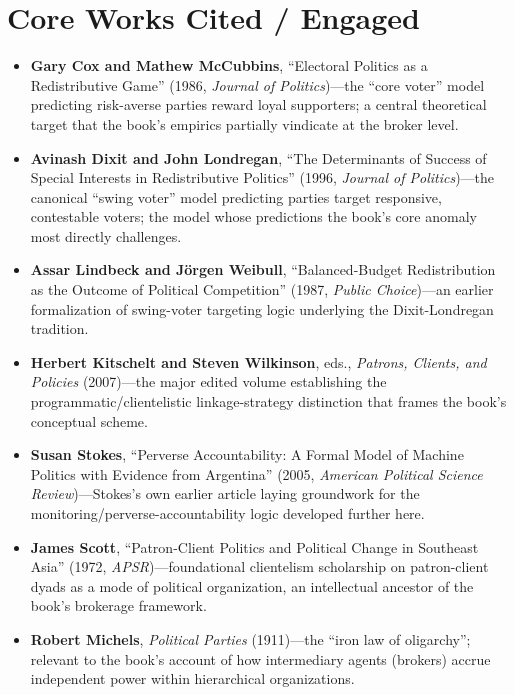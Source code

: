 \documentclass[12pt]{article}
\begin{document}
\section{Core Works Cited / Engaged}

\begin{itemize}[leftmargin=*, itemsep=4pt]
    \item \textbf{Gary Cox and Mathew McCubbins}, ``Electoral Politics as a Redistributive Game'' (1986, \textit{Journal of Politics})---the ``core voter'' model predicting risk-averse parties reward loyal supporters; a central theoretical target that the book's empirics partially vindicate at the broker level.
    \item \textbf{Avinash Dixit and John Londregan}, ``The Determinants of Success of Special Interests in Redistributive Politics'' (1996, \textit{Journal of Politics})---the canonical ``swing voter'' model predicting parties target responsive, contestable voters; the model whose predictions the book's core anomaly most directly challenges.
    \item \textbf{Assar Lindbeck and J\"orgen Weibull}, ``Balanced-Budget Redistribution as the Outcome of Political Competition'' (1987, \textit{Public Choice})---an earlier formalization of swing-voter targeting logic underlying the Dixit-Londregan tradition.
    \item \textbf{Herbert Kitschelt and Steven Wilkinson}, eds., \textit{Patrons, Clients, and Policies} (2007)---the major edited volume establishing the programmatic/clientelistic linkage-strategy distinction that frames the book's conceptual scheme.
    \item \textbf{Susan Stokes}, ``Perverse Accountability: A Formal Model of Machine Politics with Evidence from Argentina'' (2005, \textit{American Political Science Review})---Stokes's own earlier article laying groundwork for the monitoring/perverse-accountability logic developed further here.
    \item \textbf{James Scott}, ``Patron-Client Politics and Political Change in Southeast Asia'' (1972, \textit{APSR})---foundational clientelism scholarship on patron-client dyads as a mode of political organization, an intellectual ancestor of the book's brokerage framework.
    \item \textbf{Robert Michels}, \textit{Political Parties} (1911)---the ``iron law of oligarchy''; relevant to the book's account of how intermediary agents (brokers) accrue independent power within hierarchical organizations.

\end{itemize}
\end{document}
